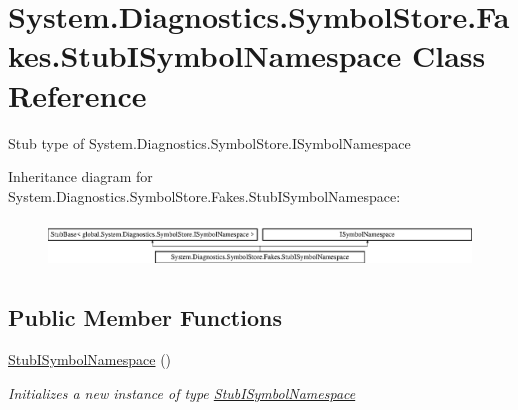 \hypertarget{class_system_1_1_diagnostics_1_1_symbol_store_1_1_fakes_1_1_stub_i_symbol_namespace}{\section{System.\-Diagnostics.\-Symbol\-Store.\-Fakes.\-Stub\-I\-Symbol\-Namespace Class Reference}
\label{class_system_1_1_diagnostics_1_1_symbol_store_1_1_fakes_1_1_stub_i_symbol_namespace}
}


Stub type of System.\-Diagnostics.\-Symbol\-Store.\-I\-Symbol\-Namespace 


Inheritance diagram for System.\-Diagnostics.\-Symbol\-Store.\-Fakes.\-Stub\-I\-Symbol\-Namespace\-:\begin{figure}[H]
\begin{center}
\leavevmode
\includegraphics[height=1.293303cm]{class_system_1_1_diagnostics_1_1_symbol_store_1_1_fakes_1_1_stub_i_symbol_namespace}
\end{center}
\end{figure}
\subsection*{Public Member Functions}
\begin{DoxyCompactItemize}
\item 
\hyperlink{class_system_1_1_diagnostics_1_1_symbol_store_1_1_fakes_1_1_stub_i_symbol_namespace_afeae81f6e97bfd4e2cbb75c3bd8f33fd}{Stub\-I\-Symbol\-Namespace} ()
\begin{DoxyCompactList}\small\item\em Initializes a new instance of type \hyperlink{class_system_1_1_diagnostics_1_1_symbol_store_1_1_fakes_1_1_stub_i_symbol_namespace}{Stub\-I\-Symbol\-Namespace}\end{DoxyCompactList}\end{DoxyCompactItemize}
